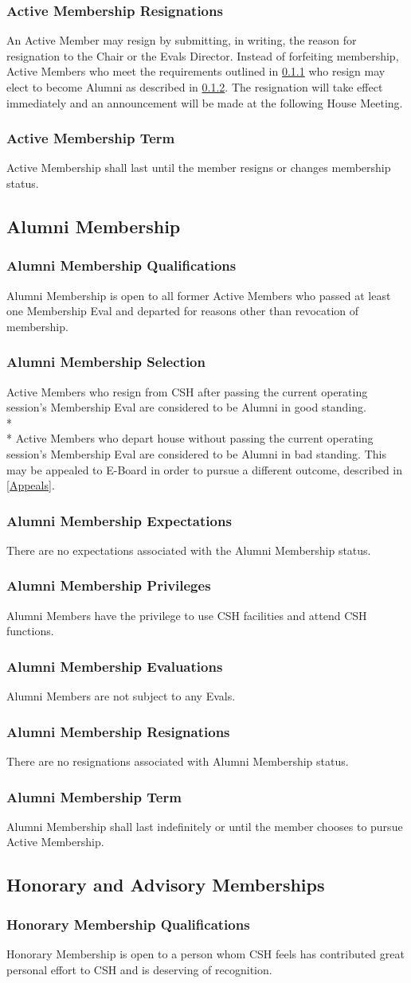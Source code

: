 \documentclass{article}
\newcommand{\asection}[1]{\subsection{#1} \label{#1}}
\newcommand{\asubsection}[1]{\subsubsection{#1} \label{#1}}
\begin{document}
\asubsection{Active Membership Resignations}
An Active Member may resign by submitting, in writing, the reason for resignation to the Chair or the Evals Director.
Instead of forfeiting membership, Active Members who meet the requirements outlined in \ref{Alumni Membership Qualifications} who resign may elect to become Alumni as described in \ref{Alumni Membership Selection}.
The resignation will take effect immediately and an announcement will be made at the following House Meeting.

\asubsection{Active Membership Term}
Active Membership shall last until the member resigns or changes membership status.

\asection{Alumni Membership}

\asubsection{Alumni Membership Qualifications}
Alumni Membership is open to all former Active Members who passed at least one Membership Eval and departed for reasons other than revocation of membership.

\asubsection{Alumni Membership Selection}
Active Members who resign from CSH after passing the current operating session's Membership Eval are considered to be Alumni in good standing.
\\*\\*
Active Members who depart house without passing the current operating session's Membership Eval are considered to be Alumni in bad standing.
This may be appealed to E-Board in order to pursue a different outcome, described in \ref{Appeals}.

\asubsection{Alumni Membership Expectations}
There are no expectations associated with the Alumni Membership status.

\asubsection{Alumni Membership Privileges}
Alumni Members have the privilege to use CSH facilities and attend CSH functions.

\asubsection{Alumni Membership Evaluations}
Alumni Members are not subject to any Evals.

\asubsection{Alumni Membership Resignations}
There are no resignations associated with Alumni Membership status.

\asubsection{Alumni Membership Term}
Alumni Membership shall last indefinitely or until the member chooses to pursue Active Membership.

\asection{Honorary and Advisory Memberships}

\asubsection{Honorary Membership Qualifications}
Honorary Membership is open to a person whom CSH feels has contributed great personal effort to CSH and is deserving of recognition.
\end{document}
